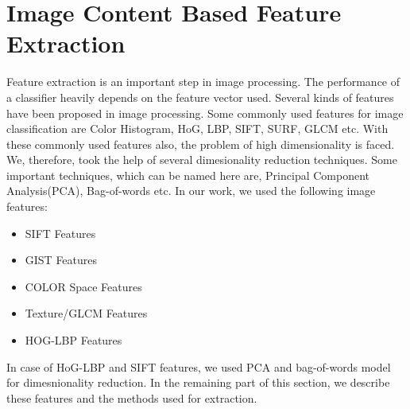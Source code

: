 \section{Image Content Based Feature Extraction}
Feature extraction is an important step in image processing. The performance of a classifier heavily depends on the feature vector used. Several kinds of features have been proposed in image processing. Some commonly used features for image classification are Color Histogram, HoG, LBP, SIFT, SURF, GLCM etc. With these commonly used features also, the problem of high dimensionality is faced.
We, therefore, took the help of several dimesionality reduction techniques. Some important techniques, which can be named here are, Principal Component Analysis(PCA), Bag-of-words etc. In our work, we used the following image features:
\begin{itemize}
\item SIFT Features
\item GIST Features
\item COLOR Space Features
\item Texture/GLCM Features
\item HOG-LBP Features
\end{itemize}
In case of HoG-LBP and SIFT features, we used PCA and bag-of-words model for dimesnionality reduction. In the remaining part of this section, we describe these features and the methods used for extraction.

